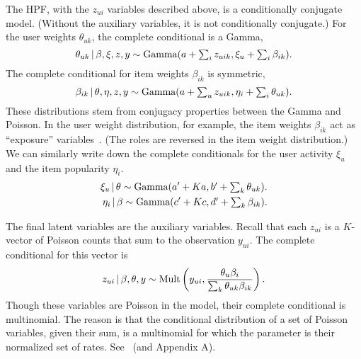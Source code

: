 The HPF, with the $z_{ui}$ variables described above, is a
conditionally conjugate model.  (Without the auxiliary variables, it
is not conditionally conjugate.) For the user weights $\theta_{uk}$,
the complete conditional is a Gamma,
\begin{equation}
  \label{eq:user-weight-cc}
  \theta_{uk} \,\vert\, \beta, \xi, z, y \sim
  \textrm{Gamma}(a + \textstyle \sum_{i} z_{uik}, \xi_u + \sum_{i} \beta_{ik}).
\end{equation}
The complete conditional for item weights $\beta_{ik}$ is symmetric,
\begin{equation}
  \label{eq:item-weight-cc}
  \beta_{ik} \,\vert\, \theta, \eta, z, y \sim
  \textrm{Gamma}(a + \textstyle \sum_{u} z_{uik}, \eta_i + \sum_{i} \theta_{uk}).
\end{equation}
These distributions stem from conjugacy properties between the Gamma
and Poisson. In the user weight distribution, for example, the item
weights $\beta_{ik}$ act as ``exposure'' variables~\cite{Gelman:1995}.
(The roles are reversed in the item weight distribution.) We can
similarly write down the complete conditionals for the user activity
$\xi_u$ and the item popularity $\eta_i$.
\begin{align}
  \label{eq:user-weight-cc}
  \xi_{u} \,\vert\, \theta \sim
  \textrm{Gamma}(a' + \textstyle Ka, b' + \sum_{k} \theta_{uk}).\nonumber\\
  \eta_{i} \,\vert\, \beta \sim
  \textrm{Gamma}(c' + \textstyle Kc, d' + \sum_{k} \beta_{ik}).\nonumber\\
\end{align}

The final latent variables are the auxiliary variables.  Recall that
each $z_{ui}$ is a $K$-vector of Poisson counts that sum to the
observation $y_{ui}$. The complete conditional for this vector is
\begin{equation}
  \label{eq:aux-cc}
  z_{ui} \,\vert\, \beta, \theta, y \sim \textrm{Mult}\left(y_{ui}, \frac{\theta_{u} 
      \beta_{i}}{\textstyle \sum_{k} \theta_{uk} \beta_{ik}}\right).
\end{equation}
Though these variables are Poisson in the model, their complete
conditional is multinomial.  The reason is that the conditional
distribution of a set of Poisson variables, given their sum, is a
multinomial for which the parameter is their normalized set of rates.
See~\cite{Johnson:2005} (and Appendix A).

